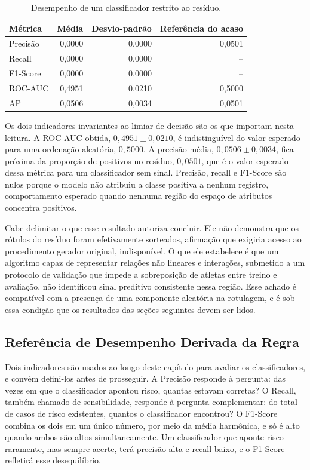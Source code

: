 \begin{table}[H]
\centering
\caption{Desempenho de um classificador restrito ao resíduo.}
\label{tab:residuo}
\begin{tabular}{lrrr}
\toprule
Métrica & Média & Desvio-padrão & Referência do acaso \\
\midrule
Precisão  & 0{,}0000 & 0{,}0000 & 0{,}0501 \\
Recall    & 0{,}0000 & 0{,}0000 & -- \\
F1-Score  & 0{,}0000 & 0{,}0000 & -- \\
ROC-AUC   & 0{,}4951 & 0{,}0210 & 0{,}5000 \\
AP        & 0{,}0506 & 0{,}0034 & 0{,}0501 \\
\bottomrule
\end{tabular}
\end{table}

Os dois indicadores invariantes ao limiar de decisão são os que importam nesta leitura. A ROC-AUC obtida, $0{,}4951 \pm 0{,}0210$, é indistinguível do valor esperado para uma ordenação aleatória, $0{,}5000$. A precisão média, $0{,}0506 \pm 0{,}0034$, fica próxima da proporção de positivos no resíduo, $0{,}0501$, que é o valor esperado dessa métrica para um classificador sem sinal. Precisão, recall e F1-Score são nulos porque o modelo não atribuiu a classe positiva a nenhum registro, comportamento esperado quando nenhuma região do espaço de atributos concentra positivos.

Cabe delimitar o que esse resultado autoriza concluir. Ele não demonstra que os rótulos do resíduo foram efetivamente sorteados, afirmação que exigiria acesso ao procedimento gerador original, indisponível. O que ele estabelece é que um algoritmo capaz de representar relações não lineares e interações, submetido a um protocolo de validação que impede a sobreposição de atletas entre treino e avaliação, não identificou sinal preditivo consistente nessa região. Esse achado é compatível com a presença de uma componente aleatória na rotulagem, e é sob essa condição que os resultados das seções seguintes devem ser lidos.

\subsection{Referência de Desempenho Derivada da Regra}
\label{sec:limite}

Dois indicadores são usados ao longo deste capítulo para avaliar os classificadores, e convém defini-los antes de prosseguir. A Precisão responde à pergunta: das vezes em que o classificador apontou risco, quantas estavam corretas? O Recall, também chamado de sensibilidade, responde à pergunta complementar: do total de casos de risco existentes, quantos o classificador encontrou? O F1-Score combina os dois em um único número, por meio da média harmônica, e só é alto quando ambos são altos simultaneamente. Um classificador que aponte risco raramente, mas sempre acerte, terá precisão alta e recall baixo, e o F1-Score refletirá esse desequilíbrio.

